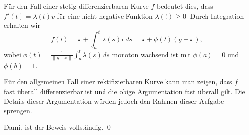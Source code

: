 \documentclass{article}
\newcommand{\norm}[1]{\|#1\|}
\begin{document}
Für den Fall einer stetig differenzierbaren Kurve $f$ bedeutet dies, dass $f'(t) = \lambda(t) v$ für eine nicht-negative Funktion $\lambda(t) \geq 0$. Durch Integration erhalten wir:
\[
f(t) = x + \int_a^t \lambda(s) v \, ds = x + \phi(t)(y-x),
\]
wobei $\phi(t) = \frac{1}{\norm{y-x}} \int_a^t \lambda(s) \, ds$ monoton wachsend ist mit $\phi(a) = 0$ und $\phi(b) = 1$.

Für den allgemeinen Fall einer rektifizierbaren Kurve kann man zeigen, dass $f$ fast überall differenzierbar ist und die obige Argumentation fast überall gilt. Die Details dieser Argumentation würden jedoch den Rahmen dieser Aufgabe sprengen.

Damit ist der Beweis vollständig. \qed
\end{document}
